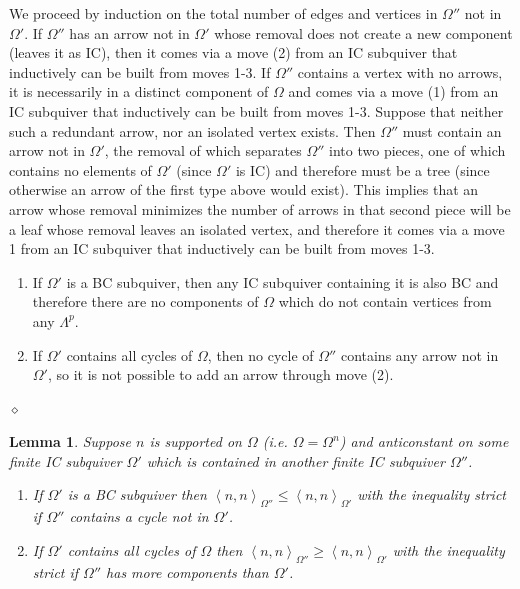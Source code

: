 \documentclass{article}
\newcommand{\bracket}[1]{\left \langle #1 \right\rangle}
\newtheorem{lemma}{Lemma}[section]
\newenvironment{proof}{\vspace*{2ex}\noindent {\em Proof:}
}{\hfill $\diamond$ \\[2ex]}
\begin{document}
\begin{proof}
We proceed by induction on the total number of edges and vertices in $\Omega''$ not in $\Omega'$. If $\Omega''$ has an arrow not in $\Omega'$ whose removal does not create a new component (leaves it as IC), then it comes via a move (2) from an IC subquiver that inductively can be built from moves 1-3.  If $\Omega''$ contains a vertex with no arrows, it is necessarily in a distinct component of $\Omega$ and comes via a move (1) from an IC subquiver that inductively can be built from moves 1-3. Suppose that neither such a redundant arrow, nor an isolated vertex exists. Then $\Omega''$ must contain an arrow not in $\Omega'$, the removal of which separates $\Omega''$ into two pieces, one of which contains no elements of $\Omega'$ (since $\Omega'$ is IC) and therefore must be a tree (since otherwise an arrow of the first type above would exist). This implies that an arrow whose removal minimizes the number of arrows in that second piece will be a leaf whose removal leaves an isolated vertex, and therefore it comes via a move 1 from an IC subquiver that inductively can be built from moves 1-3.

\begin{enumerate}
    \item If $\Omega'$ is a BC subquiver, then any IC subquiver containing it is also BC and therefore there are no components of $\Omega$ which do not contain vertices from any $\Lambda^p$.
    
    \item If $\Omega'$ contains all cycles of $\Omega$, then no cycle of $\Omega''$ contains any arrow not in $\Omega'$, so it is not possible to add an arrow through move (2).  
\end{enumerate}
\end{proof}


\begin{lemma}\label{lem: constant on complement of chain of quivers}
Suppose $n$ is supported on $\Omega$ (i.e. $\Omega=\Omega^n$) and anticonstant on some finite IC subquiver $\Omega'$ which is contained in another finite IC subquiver $\Omega''$.   

\begin{enumerate}
    \item If $\Omega'$ is a BC subquiver then $\bracket{n , n}_{\Omega''} \leq \bracket{n , n}_{\Omega'}$ with the inequality strict if $\Omega''$ contains a cycle not in $\Omega'$. 
    \item If $\Omega'$ contains all cycles of $\Omega$ then $\bracket{n , n}_{\Omega''} \geq \bracket{n , n}_{\Omega'}$ with the inequality strict if $\Omega''$ has more components than $\Omega'$. 
\end{enumerate}
\end{lemma}
\end{document}
